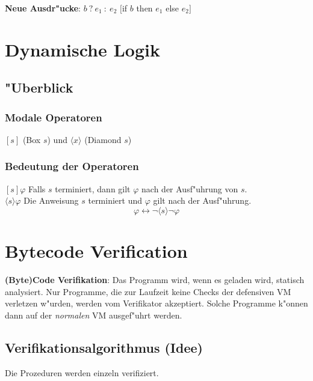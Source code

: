 \documentclass[german,10pt, a4paper, twocolumn]{scrartcl}
\theoremstyle{definition}
\theoremstyle{remark}
\begin{document}
\textbf{Neue Ausdr"ucke}: $b\ ?\ e_1\ :\ e_2$ $[$if $b$ then $e_1$ else $e_2]$

\section{Dynamische Logik}

\subsection{"Uberblick}

\subsubsection{Modale Operatoren}

$[s]$ (Box $s$) und $\langle x \rangle$ (Diamond $s$)

\subsubsection{Bedeutung der Operatoren}

$[s] \varphi$ Falls $s$ terminiert, dann gilt $\varphi$ nach der Ausf"uhrung von $s$.\\
$\langle s \rangle \varphi$ Die Anweisung $s$ terminiert und $\varphi$ gilt nach der Ausf"uhrung.\\

\begin{displaymath}
	[s] \varphi \leftrightarrow \lnot \langle s \rangle \lnot \varphi
\end{displaymath}

\section{Bytecode Verification}

\textbf{(Byte)Code Verifikation}: Das Programm wird, wenn es geladen wird, statisch analysiert. Nur Programme, die zur Laufzeit keine Checks der defensiven VM verletzen w"urden, werden vom Verifikator akzeptiert. Solche Programme k"onnen dann auf der \textit{normalen} VM ausgef"uhrt werden.

\subsection{Verifikationsalgorithmus (Idee)}

Die Prozeduren werden einzeln verifiziert.\\
\end{document}
